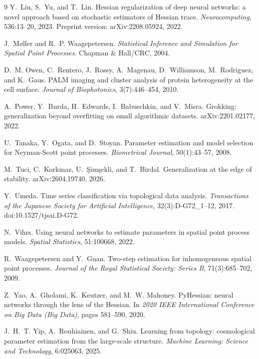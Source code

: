 \documentclass[11pt,a4paper]{article}
\begin{document}
{\begin{thebibliography}{9}
Y.~Liu, S.~Yu, and T.~Lin.
\newblock Hessian regularization of deep neural networks: a novel approach
based on stochastic estimators of Hessian trace.
\newblock \emph{Neurocomputing}, 536:13--20, 2023.
\newblock Preprint version: arXiv:2208.05924, 2022.

J.~M\o ller and R.~P. Waagepetersen.
\newblock \emph{Statistical Inference and Simulation for Spatial Point
Processes}.
\newblock Chapman \& Hall/CRC, 2004.

D.~M. Owen, C.~Rentero, J.~Rossy, A.~Magenau, D.~Williamson, M.~Rodriguez, and
K.~Gaus.
\newblock PALM imaging and cluster analysis of protein heterogeneity at the cell
surface.
\newblock \emph{Journal of Biophotonics}, 3(7):446--454, 2010.

A.~Power, Y.~Burda, H.~Edwards, I.~Babuschkin, and V.~Misra.
\newblock Grokking: generalization beyond overfitting on small algorithmic
datasets.
\newblock arXiv:2201.02177, 2022.

U.~Tanaka, Y.~Ogata, and D.~Stoyan.
\newblock Parameter estimation and model selection for Neyman-Scott point
processes.
\newblock \emph{Biometrical Journal}, 50(1):43--57, 2008.

M.~Tuci, C.~Korkmaz, U.~\c{S}im\c{s}ekli, and T.~Birdal.
\newblock Generalization at the edge of stability.
\newblock arXiv:2604.19740, 2026.

Y.~Umeda.
\newblock Time series classification via topological data analysis.
\newblock \emph{Transactions of the Japanese Society for Artificial
Intelligence}, 32(3):D-G72\_1--12, 2017.
\newblock doi:10.1527/tjsai.D-G72.

N.~Vihrs.
\newblock Using neural networks to estimate parameters in spatial point process
models.
\newblock \emph{Spatial Statistics}, 51:100668, 2022.

R.~Waagepetersen and Y.~Guan.
\newblock Two-step estimation for inhomogeneous spatial point processes.
\newblock \emph{Journal of the Royal Statistical Society: Series B},
71(3):685--702, 2009.

Z.~Yao, A.~Gholami, K.~Keutzer, and M.~W. Mahoney.
\newblock PyHessian: neural networks through the lens of the Hessian.
\newblock In \emph{2020 IEEE International Conference on Big Data (Big Data)},
pages 581--590, 2020.

J.~H.~T. Yip, A.~Rouhiainen, and G.~Shiu.
\newblock Learning from topology: cosmological parameter estimation from the
large-scale structure.
\newblock \emph{Machine Learning: Science and Technology}, 6:025063, 2025.

\end{thebibliography}
}
\end{document}

